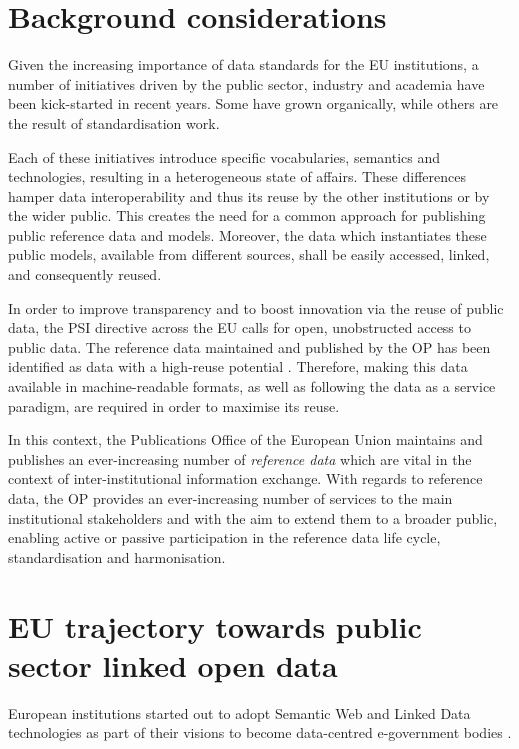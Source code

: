 	\section{Background considerations}
	
	Given the increasing importance of data standards for the EU institutions, a number of initiatives driven by the public sector, industry and academia have been kick-started in recent years. Some have grown organically, while others are the result of standardisation work. 
	
	Each of these initiatives introduce specific vocabularies, semantics and technologies, resulting in a heterogeneous state of affairs. These differences hamper data interoperability and thus its reuse by the other institutions or by the wider public. This creates the need for a common approach for publishing public reference data and models. Moreover, the data which instantiates these public models, available from different sources, shall be easily accessed, linked, and consequently reused.
	
	In order to improve transparency and to boost innovation via the reuse of public data, the PSI directive \cite{directive-2019/1024} across the EU calls for open, unobstructed access to public data. The reference data maintained and published by the OP has been identified as data with a high-reuse potential \cite{d-high-value-assets}. Therefore, making this data available in machine-readable formats, as well as following the data as a service paradigm, are required in order to maximise its reuse.
	
	In this context, the Publications Office of the European Union maintains and publishes an ever-increasing number of \textit{reference data} which are vital in the context of inter-institutional information exchange. With regards to reference data, the OP provides an ever-increasing number of services to the main institutional stakeholders and with the aim to extend them to a broader public, enabling active or passive participation in the reference data life cycle, standardisation and harmonisation.

	\section{EU trajectory towards public sector linked open data}
	
	European institutions started out to adopt Semantic Web and Linked Data technologies as part of their visions to become data-centred e-government bodies \citep{decission-456/2005/EC,decission-2015/2240}. 
	
